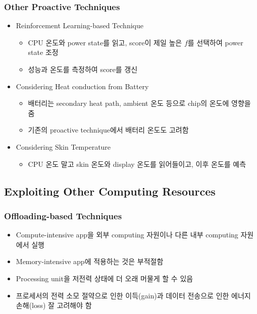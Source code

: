 \subsubsection*{Other Proactive Techniques}
\begin{itemize}
    \item Reinforcement Learning-based Technique
    \begin{itemize}
        \item CPU 온도와 power state를 읽고, score이 제일 높은 $f$를 선택하여 power state 조정
        \item 성능과 온도를 측정하여 score를 갱신
    \end{itemize}
    \item Considering Heat conduction from Battery
    \begin{itemize}
        \item 배터리는 secondary heat path, ambient 온도 등으로 chip의 온도에 영향을 줌
        \item 기존의 proactive technique에서 배터리 온도도 고려함
    \end{itemize}
    \item Considering Skin Temperature
    \begin{itemize}
        \item CPU 온도 말고 skin 온도와 display 온도를 읽어들이고, 이후 온도를 예측
    \end{itemize}
\end{itemize}

\subsection{Exploiting Other Computing Resources}

\subsubsection*{Offloading-based Techniques}
\begin{itemize}
    \item Compute-intensive app을 외부 computing 자원이나 다른 내부 computing 자원에서 실행
    \item Memory-intensive app에 적용하는 것은 부적절함
    \item Processing unit을 저전력 상태에 더 오래 머물게 할 수 있음
    \item 프로세서의 전력 소모 절약으로 인한 이득(gain)과 데이터 전송으로 인한 에너지 손해(loss) 잘 고려해야 함
\end{itemize}

